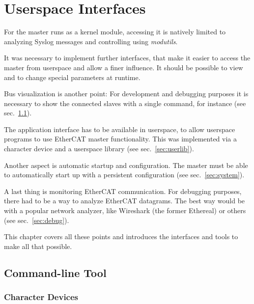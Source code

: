 \documentclass[a4paper,12pt,BCOR6mm,bibtotoc,idxtotoc]{scrbook}
\begin{document}

\chapter{Userspace Interfaces}
\label{sec:user}

For the master runs as a kernel module, accessing it is natively limited to
analyzing Syslog messages and controlling using \textit{modutils}.

It was necessary to implement further interfaces, that make it easier to access
the master from userspace and allow a finer influence. It should be possible
to view and to change special parameters at runtime.

Bus visualization is another point: For development and debugging purposes it
is necessary to show the connected slaves with a single command, for instance
(see sec.~\ref{sec:tool}).

The application interface has to be available in userspace, to allow userspace
programs to use EtherCAT master functionality. This was implemented via a
character device and a userspace library (see sec.~\ref{sec:userlib}).

Another aspect is automatic startup and configuration. The master must be able
to automatically start up with a persistent configuration (see
sec.~\ref{sec:system}).

A last thing is monitoring EtherCAT communication. For debugging purposes,
there had to be a way to analyze EtherCAT datagrams. The best way would be
with a popular network analyzer, like Wireshark \cite{wireshark} (the former
Ethereal) or others (see sec.~\ref{sec:debug}).

This chapter covers all these points and introduces the interfaces and tools
to make all that possible.


\section{Command-line Tool}
\label{sec:tool}


\subsection{Character Devices}
\label{sec:cdev}
\end{document}
